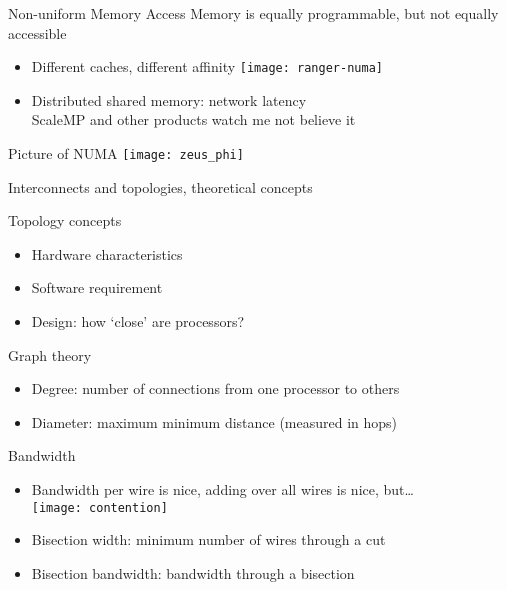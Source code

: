 \begin{numberedframe}{Non-uniform Memory Access}
  Memory is equally programmable, but not equally accessible
  \begin{itemize}
  \item Different caches, different affinity
  \texttt{[image: ranger-numa]}
  \item Distributed shared memory: network latency\\
    ScaleMP and other products {\tiny watch me not believe it}
  \end{itemize}
\end{numberedframe}

\begin{numberedframe}{Picture of NUMA}
\texttt{[image: zeus\_phi]}
\end{numberedframe}

 {Interconnects and topologies, theoretical concepts}

\begin{numberedframe}{Topology concepts}
  \begin{itemize}
  \item Hardware characteristics
  \item Software requirement
  \item Design: how `close' are processors?
  \end{itemize}
\end{numberedframe}

\begin{numberedframe}{Graph theory}
  \begin{itemize}
  \item Degree: number of connections from one processor to others
  \item Diameter: maximum minimum distance (measured in hops)
  \end{itemize}
\end{numberedframe}

\begin{numberedframe}{Bandwidth}
  \begin{itemize}
  \item Bandwidth per wire is nice, adding over all wires is nice, but\ldots\\
  \texttt{[image: contention]}
  \item Bisection width: minimum number of wires through a cut
  \item Bisection bandwidth: bandwidth through a bisection
  \end{itemize}
\end{numberedframe}

